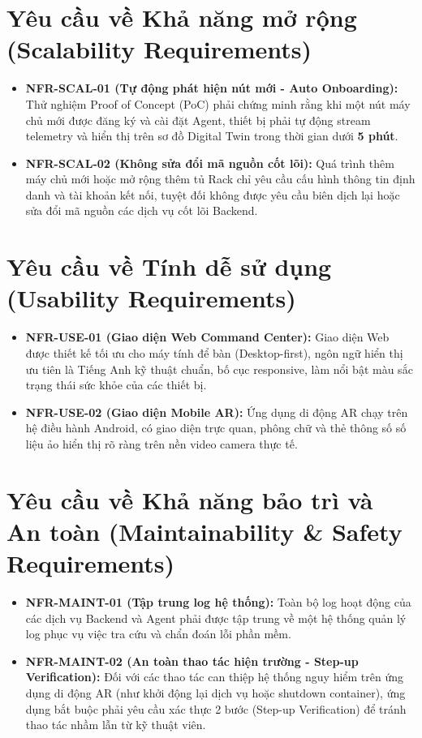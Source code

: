 \section{Yêu cầu về Khả năng mở rộng (Scalability Requirements)}
\begin{itemize}
    \item \textbf{NFR-SCAL-01 (Tự động phát hiện nút mới - Auto Onboarding):} Thử nghiệm Proof of Concept (PoC) phải chứng minh rằng khi một nút máy chủ mới được đăng ký và cài đặt Agent, thiết bị phải tự động stream telemetry và hiển thị trên sơ đồ Digital Twin trong thời gian dưới \textbf{5 phút}.
    \item \textbf{NFR-SCAL-02 (Không sửa đổi mã nguồn cốt lõi):} Quá trình thêm máy chủ mới hoặc mở rộng thêm tủ Rack chỉ yêu cầu cấu hình thông tin định danh và tài khoản kết nối, tuyệt đối không được yêu cầu biên dịch lại hoặc sửa đổi mã nguồn các dịch vụ cốt lõi Backend.
\end{itemize}

\section{Yêu cầu về Tính dễ sử dụng (Usability Requirements)}
\begin{itemize}
    \item \textbf{NFR-USE-01 (Giao diện Web Command Center):} Giao diện Web được thiết kế tối ưu cho máy tính để bàn (Desktop-first), ngôn ngữ hiển thị ưu tiên là Tiếng Anh kỹ thuật chuẩn, bố cục responsive, làm nổi bật màu sắc trạng thái sức khỏe của các thiết bị.
    \item \textbf{NFR-USE-02 (Giao diện Mobile AR):} Ứng dụng di động AR chạy trên hệ điều hành Android, có giao diện trực quan, phông chữ và thẻ thông số số liệu ảo hiển thị rõ ràng trên nền video camera thực tế.
\end{itemize}

\section{Yêu cầu về Khả năng bảo trì và An toàn (Maintainability \& Safety Requirements)}
\begin{itemize}
    \item \textbf{NFR-MAINT-01 (Tập trung log hệ thống):} Toàn bộ log hoạt động của các dịch vụ Backend và Agent phải được tập trung về một hệ thống quản lý log phục vụ việc tra cứu và chẩn đoán lỗi phần mềm.
    \item \textbf{NFR-MAINT-02 (An toàn thao tác hiện trường - Step-up Verification):} Đối với các thao tác can thiệp hệ thống nguy hiểm trên ứng dụng di động AR (như khởi động lại dịch vụ hoặc shutdown container), ứng dụng bắt buộc phải yêu cầu xác thực 2 bước (Step-up Verification) để tránh thao tác nhầm lẫn từ kỹ thuật viên.
\end{itemize}


